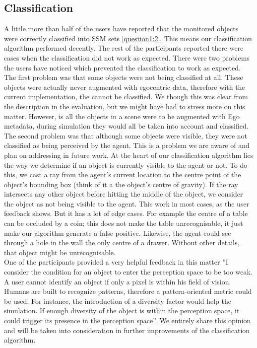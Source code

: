 \subsection{Classification} %
\label{sec:eval_classification}
A little more than half of the users have reported that the monitored objects were correctly classified into SSM sets \ref{question1:2}. This means our classification algorithm performed decently. The rest of the participants reported there were cases when the classification did not work as expected. There were two problems the users have noticed which prevented the classification to work as expected.\\

The first problem was that some objects were not being classified at all. These objects were actually never augmented with egocentric data, therefore with the current implementation, the cannot be classified. We though this was clear from the description in the evaluation, but we might have had to stress more on this matter. However, is all the objects in a scene were to be augmented with Ego metadata, during simulation they would all be taken into account and classified.\\

The second problem was that although some objects were visible, they were not classified as being perceived by the agent. This is a problem we are aware of and plan on addressing in future work. At the heart of our classification algorithm lies the way we determine if an object is currently visible to the agent or not. To do this, we cast a ray from the agent's current location to the centre point of the object's bounding box (think of it a the object's centre of gravity). If the ray intersects any other object before hitting the middle of the object, we consider the object as not being visible to the agent. This work in most cases, as the user feedback shows. But it has a lot of edge cases. For example the centre of a table can be occluded by a coin; this does not make the table unrecognisable, it just make our algorithm generate a false positive. Likewise, the agent could see through a hole in the wall the only centre of a drawer. Without other details, that object might be unrecognisable.\\

One of the participants provided a very helpful feedback in this matter ''I consider the condition for an object to enter the perception space to be too weak. A user cannot identify an object if only a pixel is within his field of vision. Humans are built to recognize patterns, therefore a pattern-oriented metric could be used. For instance, the introduction of a diversity factor would help the simulation. If enough diversity of the object is within the perception space, it could trigger its presence in the perception space''. We entirely share this opinion and will be taken into consideration in further improvements of the classification algorithm.\\

